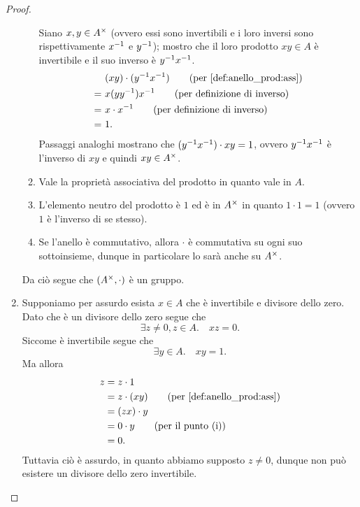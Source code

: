 \begin{proof}
\begin{enumerate}[label={(\roman*)}]
\begin{enumerate}[label={(G\arabic*)}]
            Siano $x,y \in A^{\times}$ (ovvero essi sono invertibili e i loro inversi sono rispettivamente $x^{-1}$ e $y^{-1}$); mostro che il loro prodotto $xy \in A$ è invertibile e il suo inverso è $y^{-1} x^{-1}$.
            \begin{align*}
                &(xy) \cdot (y\inv x\inv) \tag{per \ref{def:anello_prod:ass}} \\
                =\ &x (y y\inv) x\inv \tag{per definizione di inverso} \\
                =\ &x \cdot x\inv \tag{per definizione di inverso}\\
                =\ &1.
            \end{align*}
            Passaggi analoghi mostrano che $(y^{-1} x^{-1}) \cdot xy = 1$, ovvero $y^{-1} x^{-1}$ è l'inverso di $xy$ e quindi $xy \in A^{\times}$.
            \item Vale la proprietà associativa del prodotto in quanto vale in $A$.
            \item L'elemento neutro del prodotto è $1$ ed è in $A^{\times}$ in quanto $1 \cdot 1 = 1$ (ovvero $1$ è l'inverso di se stesso).
            \item Se l'anello è commutativo, allora $\cdot$ è commutativa su ogni suo sottoinsieme, dunque in particolare lo sarà anche su $A^{\times}$.
        \end{enumerate}
        Da ciò segue che $(A^{\times}, \cdot)$ è un gruppo.
        \item Supponiamo per assurdo esista $x \in A$ che è invertibile e divisore dello zero.
        Dato che è un divisore dello zero segue che \[
            \exists z \neq 0, z \in A. \quad xz = 0.    
        \] Siccome è invertibile segue che \[
            \exists y \in A. \quad xy = 1.    
        \] Ma allora \begin{align*}
            z &= z\cdot 1\\
            &= z \cdot (xy) \tag{per \ref{def:anello_prod:ass}}\\
            &= (zx) \cdot y \\
            &= 0 \cdot y \tag{per il punto (i)}\\
            &= 0.
        \end{align*} Tuttavia ciò è assurdo, in quanto abbiamo supposto $z \neq 0$, dunque non può esistere un divisore dello zero invertibile.
    \end{enumerate}
\end{proof}

